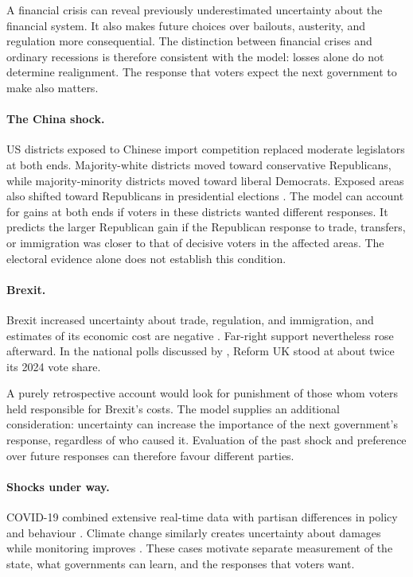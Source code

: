 \documentclass[12pt,letterpaper]{article}
\begin{document}
A financial crisis can reveal previously underestimated uncertainty about the financial system. It also makes future choices over bailouts, austerity, and regulation more consequential. The distinction between financial crises and ordinary recessions is therefore consistent with the model: losses alone do not determine realignment. The response that voters expect the next government to make also matters.

\paragraph{The China shock.}
US districts exposed to Chinese import competition replaced moderate legislators at both ends. Majority-white districts moved toward conservative Republicans, while majority-minority districts moved toward liberal Democrats. Exposed areas also shifted toward Republicans in presidential elections \citep{Autor2020}. The model can account for gains at both ends if voters in these districts wanted different responses. It predicts the larger Republican gain if the Republican response to trade, transfers, or immigration was closer to that of decisive voters in the affected areas. The electoral evidence alone does not establish this condition.

\paragraph{Brexit.}
Brexit increased uncertainty about trade, regulation, and immigration, and estimates of its economic cost are negative \citep{BornEtAl2019}. Far-right support nevertheless rose afterward. In the national polls discussed by \citet{Curtice2025}, Reform UK stood at about twice its 2024 vote share.

A purely retrospective account would look for punishment of those whom voters held responsible for Brexit's costs. The model supplies an additional consideration: uncertainty can increase the importance of the next government's response, regardless of who caused it. Evaluation of the past shock and preference over future responses can therefore favour different parties.

\paragraph{Shocks under way.}
COVID-19 combined extensive real-time data \citep{Chetty2024} with partisan differences in policy and behaviour \citep{Allcott2020,Adolph2022}. Climate change similarly creates uncertainty about damages while monitoring improves \citep{IPCC2023}. These cases motivate separate measurement of the state, what governments can learn, and the responses that voters want.
\end{document}
